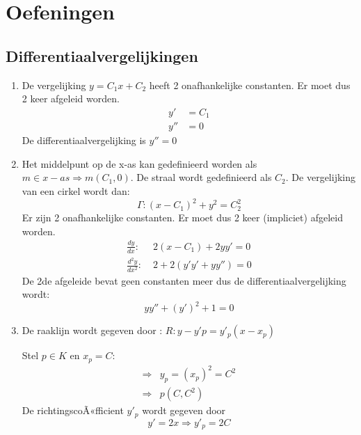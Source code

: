 \part{Oefeningen}
\chapter{Differentiaalvergelijkingen}
{
\begin{enumerate}
\item De vergelijking $y = C_1x + C_2$ heeft 2 onafhankelijke constanten. Er moet dus 2 keer afgeleid worden.
\begin{equation*}
\begin{split}
y' & = C_1 \\
y'' & = 0
\end{split}
\end{equation*}
De differentiaalvergelijking is $y'' = 0$
\item Het middelpunt op de x-as kan gedefinieerd worden als $m \in x-as \Rightarrow m(C_1, 0)$. De straal wordt gedefinieerd als $C_2$. De vergelijking van een cirkel wordt dan:
$$\Gamma: (x - C_1)^2 + y^2 = C_2^2$$
Er zijn 2 onafhankelijke constanten. Er moet dus 2 keer (impliciet) afgeleid worden.
\begin{equation*}
\begin{split}
\frac{dy}{dx} :\; & 2(x - C_1) + 2yy' = 0 \\
\frac{d^2y}{dx^2} :\; & 2 + 2(y'y' + yy'') = 0
\end{split}
\end{equation*}
De 2de afgeleide bevat geen constanten meer dus de differentiaalvergelijking wordt: 
$$yy'' + (y')^2 + 1 = 0$$
\item De raaklijn wordt gegeven door : $R: y - y'p = y'_p(x - x_p)$

Stel $p \in K$ en $x_p = C$:
\begin{equation*}
\begin{split}
\Rightarrow & y_p = (x_p)^2 = C^2 \\
\Rightarrow & p(C, C^2)
\end{split}
\end{equation*}
De richtingscoÃ«fficient $y'_p$ wordt gegeven door 
$$y'= 2x \Rightarrow y'_p = 2C$$


\end{enumerate}}

